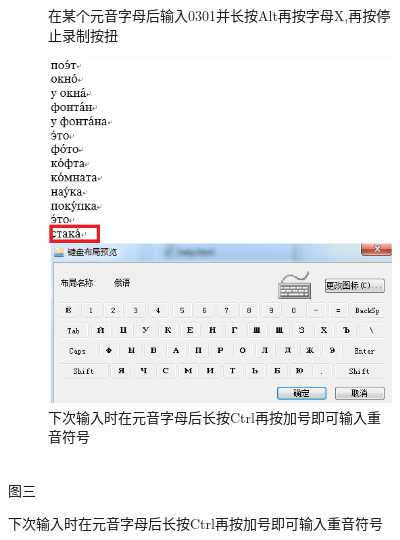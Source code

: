 \documentclass[10.5pt]{ctexart}
\begin{document}
\begin{enumerate}
\begin{figure}[!ht]
\begin{subfigure}[b]{0.4\textwidth}
        \caption{在某个元音字母后输入0301并长按Alt再按字母X,再按停止录制按扭}
\end{subfigure}\qquad	
\begin{subfigure}[b]{0.4\textwidth}
        \includegraphics[width=\textwidth]{figure12.png}
        \caption{下次输入时在元音字母后长按Ctrl再按加号即可输入重音符号}
\end{subfigure}\\
图三
\end{figure}
\end{enumerate}
\end{document}
